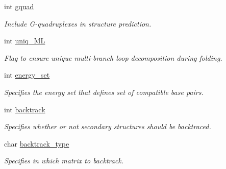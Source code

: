 \begin{DoxyCompactItemize}
int \mbox{\hyperlink{group__model__details_af88a511a2b1f526b4c6213de6cb8fd6e}{gquad}}
\begin{DoxyCompactList}\small\item\em Include G-\/quadruplexes in structure prediction. \end{DoxyCompactList}\item 
\mbox{\label{group__model__details_ade065b814a4e2e72ead93ab502613ed2}} 
int \mbox{\hyperlink{group__model__details_ade065b814a4e2e72ead93ab502613ed2}{uniq\+\_\+\+ML}}
\begin{DoxyCompactList}\small\item\em Flag to ensure unique multi-\/branch loop decomposition during folding. \end{DoxyCompactList}\item 
\mbox{\label{group__model__details_a5eee4e3b468eb690d1407e0178dafb3f}} 
int \mbox{\hyperlink{group__model__details_a5eee4e3b468eb690d1407e0178dafb3f}{energy\+\_\+set}}
\begin{DoxyCompactList}\small\item\em Specifies the energy set that defines set of compatible base pairs. \end{DoxyCompactList}\item 
\mbox{\label{group__model__details_a31f4471608cbdd03887f63c281823adb}} 
int \mbox{\hyperlink{group__model__details_a31f4471608cbdd03887f63c281823adb}{backtrack}}
\begin{DoxyCompactList}\small\item\em Specifies whether or not secondary structures should be backtraced. \end{DoxyCompactList}\item 
\mbox{\label{group__model__details_abb265da25121d22ed11c8435861f0e53}} 
char \mbox{\hyperlink{group__model__details_abb265da25121d22ed11c8435861f0e53}{backtrack\+\_\+type}}
\begin{DoxyCompactList}\small\item\em Specifies in which matrix to backtrack. \end{DoxyCompactList}\item 
\mbox{\label{group__model__details_aa0c3e03d9064363e27adcc92b8d0380f}} 

\end{DoxyCompactItemize}

